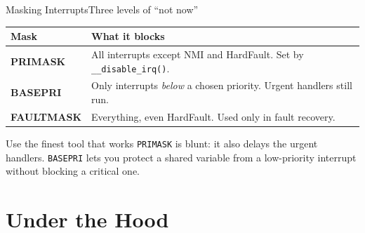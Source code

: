 \documentclass[9pt,aspectratio=169,xcolor=table]{beamer}
\begin{document}
\begin{frame}{Masking Interrupts}{Three levels of ``not now''}
    \begin{center}
    {\small
    \striped
    \begin{tabular}{@{}l R{.62\textwidth}@{}}
        \toprule
        \textbf{Mask} & \textbf{What it blocks} \\
        \midrule
        \textbf{PRIMASK} & All interrupts except NMI and HardFault. Set by \texttt{\_\_disable\_irq()}. \\
        \textbf{BASEPRI} & Only interrupts \emph{below} a chosen priority. Urgent handlers still run. \\
        \textbf{FAULTMASK} & Everything, even HardFault. Used only in fault recovery. \\
        \bottomrule
    \end{tabular}}
    \end{center}

    \vspace{3mm}
    \begin{block}{Use the finest tool that works}
        \texttt{PRIMASK} is blunt: it also delays the urgent handlers. \texttt{BASEPRI} lets you protect a shared variable from a low-priority interrupt without blocking a critical one.
    \end{block}
\end{frame}


\section{Under the Hood}
\end{document}
